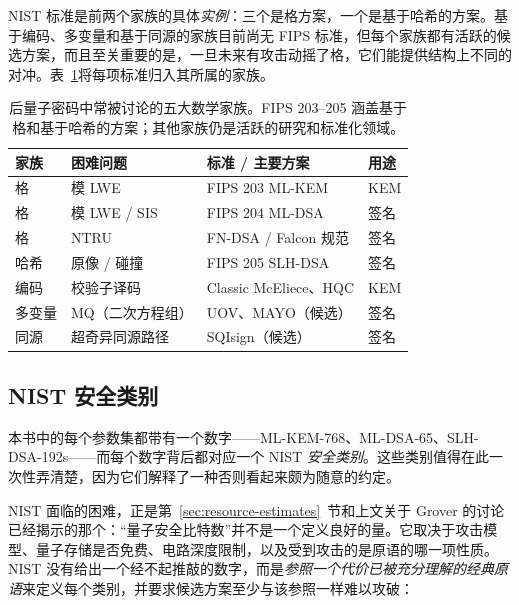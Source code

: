 NIST 标准是前两个家族的具体\emph{实例}：三个是格方案，一个是基于哈希的方案。基于编码、多变量和基于同源的家族目前尚无 FIPS 标准，但每个家族都有活跃的候选方案，而且至关重要的是，一旦未来有攻击动摇了格，它们能提供结构上不同的对冲。表~\ref{tab:pqc-families}将每项标准归入其所属的家族。

\begin{table}[H]
\centering
\small
\begin{tabular}{llll}
\toprule
家族 & 困难问题 & 标准 / 主要方案 & 用途 \\
\midrule
格 & 模 LWE & FIPS 203 ML-KEM & KEM \\
格 & 模 LWE / SIS & FIPS 204 ML-DSA & 签名 \\
格 & NTRU & FN-DSA / Falcon 规范 & 签名 \\
哈希 & 原像 / 碰撞 & FIPS 205 SLH-DSA & 签名 \\
编码 & 校验子译码 & Classic McEliece、HQC & KEM \\
多变量 & MQ（二次方程组） & UOV、MAYO（候选） & 签名 \\
同源 & 超奇异同源路径 & SQIsign（候选） & 签名 \\
\bottomrule
\end{tabular}
\caption{后量子密码中常被讨论的五大数学家族。FIPS 203--205 涵盖基于格和基于哈希的方案；其他家族仍是活跃的研究和标准化领域。}
\label{tab:pqc-families}
\end{table}

\subsection*{NIST 安全类别}
\label{sec:nist-categories}

本书中的每个参数集都带有一个数字——ML-KEM-768、ML-DSA-65、SLH-DSA-192s——而每个数字背后都对应一个 NIST \emph{安全类别}。这些类别值得在此一次性弄清楚，因为它们解释了一种否则看起来颇为随意的约定。

NIST 面临的困难，正是第~\ref{sec:resource-estimates}~节和上文关于 Grover 的讨论已经揭示的那个：“量子安全比特数”并不是一个定义良好的量。它取决于攻击模型、量子存储是否免费、电路深度限制，以及受到攻击的是原语的哪一项性质。NIST 没有给出一个经不起推敲的数字，而是\emph{参照一个代价已被充分理解的经典原语}来定义每个类别，并要求候选方案至少与该参照一样难以攻破：

